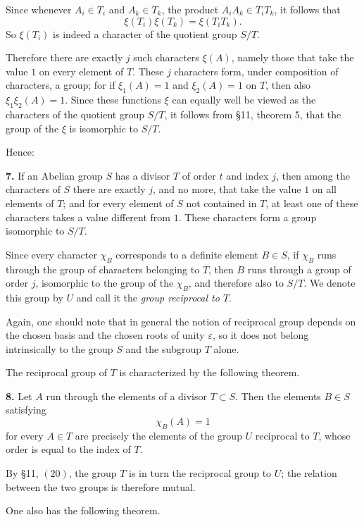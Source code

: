 \documentclass[11pt,a4paper]{book}
\begin{document}
Since whenever \(A_i\in T_i\) and \(A_k\in T_k\), the product \(A_iA_k\in T_iT_k\), it follows that
\[
\xi(T_i)\xi(T_k)=\xi(T_iT_k).
\tag{6}
\]
So \(\xi(T_i)\) is indeed a character of the quotient group \(S/T\).

Therefore there are exactly \(j\) such characters \(\xi(A)\), namely those that take the value \(1\) on every element of \(T\). These \(j\) characters form, under composition of characters, a group; for if \(\xi_1(A)=1\) and \(\xi_2(A)=1\) on \(T\), then also \(\xi_1\xi_2(A)=1\). Since these functions \(\xi\) can equally well be viewed as the characters of the quotient group \(S/T\), it follows from \S 11, theorem 5, that the group of the \(\xi\) is isomorphic to \(S/T\).

Hence:

\medskip
\noindent\textbf{7.} If an Abelian group \(S\) has a divisor \(T\) of order \(t\) and index \(j\), then among the characters of \(S\) there are exactly \(j\), and no more, that take the value \(1\) on all elements of \(T\); and for every element of \(S\) not contained in \(T\), at least one of these characters takes a value different from \(1\). These characters form a group isomorphic to \(S/T\).

\medskip
Since every character \(\chi_B\) corresponds to a definite element \(B\in S\), if \(\chi_B\) runs through the group of characters belonging to \(T\), then \(B\) runs through a group of order \(j\), isomorphic to the group of the \(\chi_B\), and therefore also to \(S/T\). We denote this group by \(U\) and call it the \emph{group reciprocal to \(T\)}.

Again, one should note that in general the notion of reciprocal group depends on the chosen basis and the chosen roots of unity \(\varepsilon\), so it does not belong intrinsically to the group \(S\) and the subgroup \(T\) alone.

The reciprocal group of \(T\) is characterized by the following theorem.

\medskip
\noindent\textbf{8.} Let \(A\) run through the elements of a divisor \(T\subset S\). Then the elements \(B\in S\) satisfying
\[
\chi_B(A)=1
\tag{7}
\]
for every \(A\in T\) are precisely the elements of the group \(U\) reciprocal to \(T\), whose order is equal to the index of \(T\).

\medskip
By \S 11, \((20)\), the group \(T\) is in turn the reciprocal group to \(U\); the relation between the two groups is therefore mutual.

One also has the following theorem.
\end{document}
